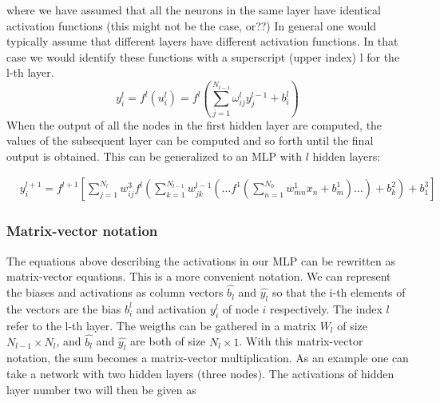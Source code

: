 \documentclass[a4paper,12pt]{article}
\begin{document}
where we have assumed that all the neurons in the same layer have identical activation functions (this might not be the case, or??) In general one would typically assume that different layers have different activation functions. In that case we would identify these functions with a superscript (upper index) l for the l-th layer.
\begin{equation}
    y_i^l = f^l(u_i^l) = f^l( \sum_{j=1}^{N_{l-1}} \omega_{ij}^l y_j^{l-1} + b_i^l )
\end{equation}
When the output of all the nodes in the first hidden layer are computed, the values of the subsequent layer can be computed and so forth until the final output is obtained.\newline
This can be generalized to an MLP with $l$ hidden layers:

\begin{align}
&y^{l+1}_i = f^{l+1}\left[\!\sum_{j=1}^{N_l} w_{ij}^3 f^l\left(\sum_{k=1}^{N_{l-1}}w_{jk}^{l-1}\left(\dots f^1\left(\sum_{n=1}^{N_0} w_{mn}^1 x_n+ b_m^1\right)\dots\right)+b_k^2\right)+b_1^3\right]
\end{align}


\subsubsection{Matrix-vector notation}
The equations above describing the activations in our MLP can be rewritten as matrix-vector equations. This is a more convenient notation.\newline
We can represent the biases and activations as column vectors $\hat{b_l}$ and $\hat{y_l}$ so that the i-th elements of the vectors are the bias $b_i^l$ and activation $y_i^l$ of node $i$ respectively. The index $l$ refer to the l-th layer.\newline
The weigths can be gathered in a matrix $W_l$ of size $N_{l-1} \times N_l$, and $\hat{b_l}$ and $\hat{y_l}$ are both of size $N_l \times 1$. With this matrix-vector notation, the sum becomes a matrix-vector multiplication. As an example one can take a network with two hidden layers (three nodes). The activations of hidden layer number two will then be given as
\end{document}
